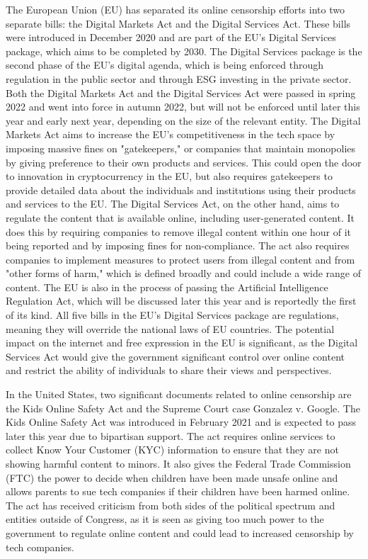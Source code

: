 The European Union (EU) has separated its online censorship efforts into two separate bills: the Digital Markets Act and the Digital Services Act. These bills were introduced in December 2020 and are part of the EU's Digital Services package, which aims to be completed by 2030. The Digital Services package is the second phase of the EU's digital agenda, which is being enforced through regulation in the public sector and through ESG investing in the private sector. Both the Digital Markets Act and the Digital Services Act were passed in spring 2022 and went into force in autumn 2022, but will not be enforced until later this year and early next year, depending on the size of the relevant entity. The Digital Markets Act aims to increase the EU's competitiveness in the tech space by imposing massive fines on "gatekeepers," or companies that maintain monopolies by giving preference to their own products and services. This could open the door to innovation in cryptocurrency in the EU, but also requires gatekeepers to provide detailed data about the individuals and institutions using their products and services to the EU. The Digital Services Act, on the other hand, aims to regulate the content that is available online, including user-generated content. It does this by requiring companies to remove illegal content within one hour of it being reported and by imposing fines for non-compliance. The act also requires companies to implement measures to protect users from illegal content and from "other forms of harm," which is defined broadly and could include a wide range of content. The EU is also in the process of passing the Artificial Intelligence Regulation Act, which will be discussed later this year and is reportedly the first of its kind. All five bills in the EU's Digital Services package are regulations, meaning they will override the national laws of EU countries. The potential impact on the internet and free expression in the EU is significant, as the Digital Services Act would give the government significant control over online content and restrict the ability of individuals to share their views and perspectives.\par
In the United States, two significant documents related to online censorship are the Kids Online Safety Act and the Supreme Court case Gonzalez v. Google. The Kids Online Safety Act was introduced in February 2021 and is expected to pass later this year due to bipartisan support. The act requires online services to collect Know Your Customer (KYC) information to ensure that they are not showing harmful content to minors. It also gives the Federal Trade Commission (FTC) the power to decide when children have been made unsafe online and allows parents to sue tech companies if their children have been harmed online. The act has received criticism from both sides of the political spectrum and entities outside of Congress, as it is seen as giving too much power to the government to regulate online content and could lead to increased censorship by tech companies.\par
